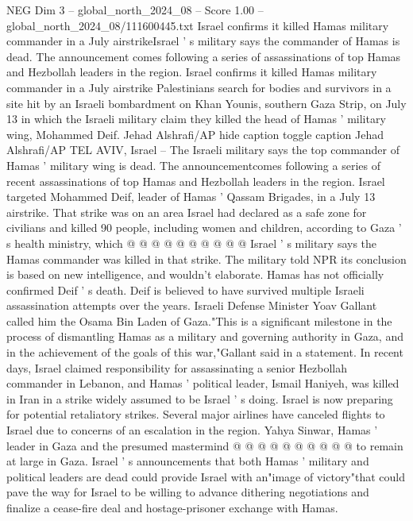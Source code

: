 \begin{textsample}{NEG Dim 3 – global\_north\_2024\_08 – Score 1.00 – global\_north\_2024\_08/111600445.txt}  \label{ex:f3_neg_317}
Israel confirms it killed Hamas military commander in a July airstrikeIsrael ' s military says the commander of Hamas is dead.
The announcement comes following a series of assassinations of top Hamas and Hezbollah leaders in the region.
Israel confirms it killed Hamas military commander in a July airstrike Palestinians search for bodies and survivors in a site hit by an Israeli bombardment on Khan Younis, southern Gaza Strip, on July 13 in which the Israeli military claim they killed the head of Hamas ' military wing, Mohammed Deif.
Jehad Alshrafi/AP hide caption toggle caption Jehad Alshrafi/AP TEL AVIV, Israel -- The Israeli military says the top commander of Hamas ' military wing is dead.
The announcementcomes following a series of recent assassinations of top Hamas and Hezbollah leaders in the region.
Israel targeted Mohammed Deif, leader of Hamas ' Qassam Brigades, in a July 13 airstrike.
That strike was on an area Israel had declared as a safe zone for civilians and killed 90 people, including women and children, according to Gaza ' s health ministry, which @ @ @ @ @ @ @ @ @ @ Israel ' s military says the Hamas commander was killed in that strike.
The military told NPR its conclusion is based on new intelligence, and wouldn't elaborate.
Hamas has not officially confirmed Deif ' s death.
Deif is believed to have survived multiple Israeli assassination attempts over the years.
Israeli Defense Minister Yoav Gallant called him the Osama Bin Laden of Gaza."This is a significant milestone in the process of dismantling Hamas as a military and governing authority in Gaza, and in the achievement of the goals of this war,"Gallant said in a statement.
In recent days, Israel claimed responsibility for assassinating a senior Hezbollah commander in Lebanon, and Hamas ' political leader, Ismail Haniyeh, was killed in Iran in a strike widely assumed to be Israel ' s doing.
Israel is now preparing for potential retaliatory strikes.
Several major airlines have canceled flights to Israel due to concerns of an escalation in the region.
Yahya Sinwar, Hamas ' leader in Gaza and the presumed mastermind @ @ @ @ @ @ @ @ @ @ to remain at large in Gaza.
Israel ' s announcements that both Hamas ' military and political leaders are dead could provide Israel with an"image of victory"that could pave the way for Israel to be willing to advance dithering negotiations and finalize a cease-fire deal and hostage-prisoner exchange with Hamas.

\end{textsample}
